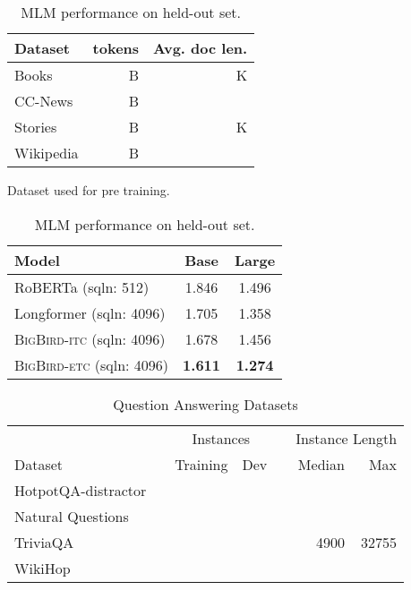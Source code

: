 \documentclass{article}
\newcommand{\bigb}{\textsc{BigBird}\xspace}
\begin{document}
\begin{table}[b]
    \centering
    \small
    \parbox{.45\linewidth}{
    \centering
    \begin{tabular}{@{}lrr@{}}
    \toprule
    Dataset &  tokens & Avg. doc len. \\
    \midrule
        Books \citep{zhu2015aligning} & B & K \\
        CC-News \citep{guu2020realm} & B &  \\
        Stories \citep{trinh2018simple} & B & K \\
        Wikipedia &  B &  \\
    \bottomrule
    \end{tabular}
    \vspace{2mm}
    \caption{Dataset used for pre training.}
    \label{tab:mlm_data}
    }
    \quad \quad
    \parbox{.45\linewidth}{
    \centering
    \begin{tabular}{@{}lcc@{}}
    \toprule
    Model &  Base & Large \\
    \midrule
    RoBERTa (sqln: 512)  & 1.846 & 1.496 \\
    Longformer (sqln: 4096)  & 1.705 & 1.358 \\
    \bigb-\textsc{itc} (sqln: 4096)   & 1.678 & 1.456 \\
    \bigb-\textsc{etc} (sqln: 4096)   & \textbf{1.611} & \textbf{1.274} \\
     \bottomrule
    \end{tabular}
    \vspace{2mm}
    \caption{MLM performance on held-out set.}
    \label{tab:mlm_bpc}
    }
\end{table}

\begin{table}
    \small
    \centering
    \begin{tabular}{@{}lrrrrrr@{}}
    \toprule
    & & \multicolumn{2}{c}{Instances} & & \multicolumn{2}{c}{Instance Length} \\
    \cmidrule{3-4} \cmidrule{6-7}
    Dataset & & Training & Dev & & Median & Max \\
    \midrule
    HotpotQA-distractor \citep{yang2018hotpotqa} & &  &  & &  &  \\
        Natural Questions \citep{kwiatkowski2019natural} & &  &  & &  &  \\
        TriviaQA \citep{JoshiTriviaQA2017} & &  &  & & 4900 & 32755 \\
        WikiHop \cite{welbl2018constructing} & &  &  & &  &  \\
    \bottomrule
    \end{tabular}
    \vspace{2mm}
        \caption{Question Answering Datasets}
    \label{tab:qa_data}
\end{table}
\end{document}
